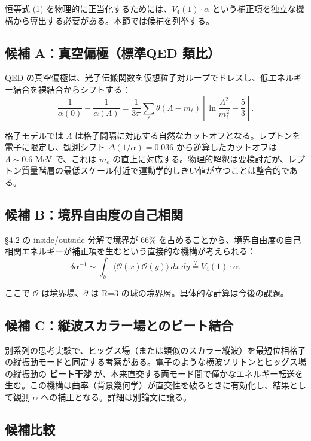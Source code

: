 \documentclass[a4paper,11pt]{ltjsarticle}
\begin{document}
恒等式 (1) を物理的に正当化するためには、$V_4(1) \cdot \alpha$ という補正項を独立な機構から導出する必要がある。本節では候補を列挙する。

\subsection{候補 A：真空偏極（標準QED 類比）}

QED の真空偏極は、光子伝搬関数を仮想粒子対ループでドレスし、低エネルギー結合を裸結合からシフトする：
\[ \frac{1}{\alpha(0)} - \frac{1}{\alpha(\Lambda)} = \frac{1}{3\pi}\sum_\ell \theta(\Lambda - m_\ell)\left[\ln\frac{\Lambda^2}{m_\ell^2} - \frac{5}{3}\right]. \]

格子モデルでは $\Lambda$ は格子間隔に対応する自然なカットオフとなる。レプトンを電子に限定し、観測シフト $\Delta(1/\alpha) = 0.036$ から逆算したカットオフは $\Lambda \sim 0.6$ MeV で、これは $m_e$ の直上に対応する。物理的解釈は要検討だが、レプトン質量階層の最低スケール付近で運動学的しきい値が立つことは整合的である。

\subsection{候補 B：境界自由度の自己相関}

§4.2 の inside/outside 分解で境界が 66\% を占めることから、境界自由度の自己相関エネルギーが補正項を生むという直接的な機構が考えられる：
\[ \delta\alpha^{-1} \sim \int_{\partial} \langle \mathcal{O}(x) \mathcal{O}(y) \rangle \, dx\, dy \stackrel{?}{=} V_4(1) \cdot \alpha. \]

ここで $\mathcal{O}$ は境界場、$\partial$ は R=3 の球の境界層。具体的な計算は今後の課題。

\subsection{候補 C：縦波スカラー場とのビート結合}

別系列の思考実験で、ヒッグス場（または類似のスカラー縦波）を最短位相格子の縦振動モードと同定する考察がある。電子のような横波ソリトンとヒッグス場の縦振動の \textbf{ビート干渉} が、本来直交する両モード間で僅かなエネルギー転送を生む。この機構は曲率（背景幾何学）が直交性を破るときに有効化し、結果として観測 $\alpha$ への補正となる。詳細は別論文に譲る。

\subsection{候補比較}
\end{document}
